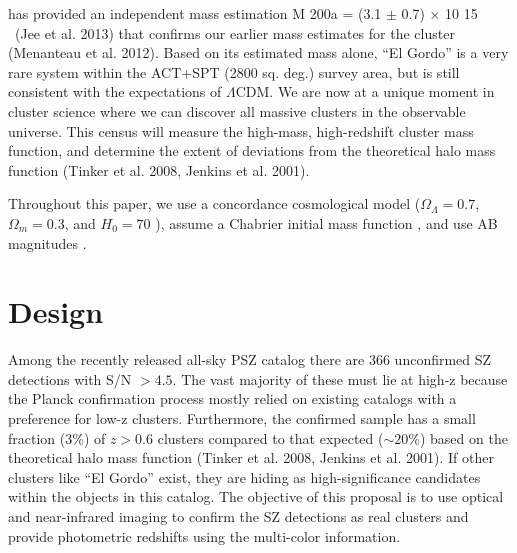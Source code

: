 \documentclass[apj, revtex4]{emulateapj}
\begin{document}
has provided an independent mass estimation M 200a = (3.1 $\pm$ 0.7) × 10 15 \Msol\ (Jee et al. 2013) that
confirms our earlier mass estimates for the cluster (Menanteau et al. 2012). Based on its estimated
mass alone, “El Gordo” is a very rare system within the ACT+SPT (2800 sq. deg.) survey area,
but is still consistent with the expectations of $\Lambda$CDM. We are now at a unique moment in cluster
science where we can discover all massive clusters in the observable universe. This census will
measure the high-mass, high-redshift cluster mass function, and determine the extent of deviations
from the theoretical halo mass function (Tinker et al. 2008, Jenkins et al. 2001).

Throughout this paper, we use a concordance cosmological model ($\Omega_\Lambda = 0.7$, $\Omega_m = 0.3$, and $H_0= 70$ \kms \mpc), assume a Chabrier initial mass function \citep{Chabrier2003}, and use AB magnitudes \citep{Oke1974}.

\section{Design}\label{sec:design}

Among the recently released all-sky
PSZ catalog there are 366 unconfirmed SZ detections with S/N $> 4.5$. The vast majority of these
must lie at high-z because the Planck confirmation process mostly relied on existing catalogs with
a preference for low-z clusters. Furthermore, the confirmed sample has a small fraction (3\%) of
$z > 0.6$ clusters compared to that expected ($\sim20$\%) based on the theoretical halo mass function
(Tinker et al. 2008, Jenkins et al. 2001). If other clusters like “El Gordo” exist, they are hiding
as high-significance candidates within the objects in this catalog. The objective of this proposal is
to use optical and near-infrared imaging to confirm the SZ detections as real clusters and provide
photometric redshifts using the multi-color information.
\end{document}

